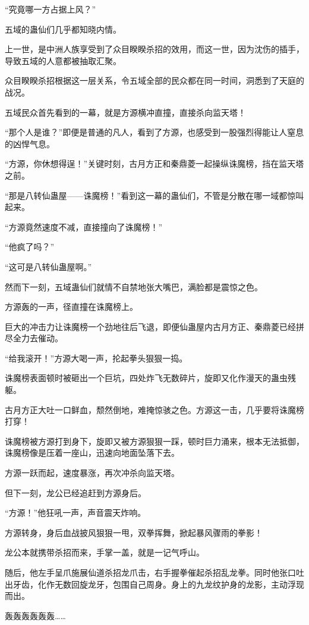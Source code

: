 \begin{this_body}
“究竟哪一方占据上风？”

五域的蛊仙们几乎都知晓内情。

上一世，是中洲人族享受到了众目睽睽杀招的效用，而这一世，因为沈伤的插手，导致五域的人意都被抽取汇聚。

众目睽睽杀招根据这一层关系，令五域全部的民众都在同一时间，洞悉到了天庭的战况。

五域民众首先看到的一幕，就是方源横冲直撞，直接杀向监天塔！

“那个人是谁？”即便是普通的凡人，看到了方源，也感受到一股强烈得能让人窒息的凶悍气息。

“方源，你休想得逞！”关键时刻，古月方正和秦鼎菱一起操纵诛魔榜，挡在监天塔之前。

“那是八转仙蛊屋——诛魔榜！”看到这一幕的蛊仙们，不管是分散在哪一域都惊叫起来。

“方源竟然速度不减，直接撞向了诛魔榜！”

“他疯了吗？”

“这可是八转仙蛊屋啊。”

然而下一刻，五域蛊仙们就情不自禁地张大嘴巴，满脸都是震惊之色。

方源轰的一声，径直撞在诛魔榜上。

巨大的冲击力让诛魔榜一个劲地往后飞退，即便仙蛊屋内古月方正、秦鼎菱已经拼尽全力去催动。

“给我滚开！”方源大喝一声，抡起拳头狠狠一捣。

诛魔榜表面顿时被砸出一个巨坑，四处炸飞无数碎片，旋即又化作漫天的蛊虫残躯。

古月方正大吐一口鲜血，颓然倒地，难掩惊骇之色。方源这一击，几乎要将诛魔榜打穿！

诛魔榜被方源打到身下，旋即又被方源狠狠一踩，顿时巨力涌来，根本无法抵御，诛魔榜像是压着一座山，迅速向地面坠落下去。

方源一跃而起，速度暴涨，再次冲杀向监天塔。

但下一刻，龙公已经追赶到方源身后。

“方源！”他狂吼一声，声音震天炸响。

方源转身，身后血战披风狠狠一甩，双拳挥舞，掀起暴风骤雨的拳影！

龙公本就携带杀招而来，手掌一盖，就是一记气呼山。

随后，他左手呈爪施展仙道杀招龙爪击，右手握拳催起杀招乱龙拳。同时他张口吐出牙齿，化作无数回旋龙牙，包围自己周身。身上的九龙纹护身的龙影，主动浮现而出。

轰轰轰轰轰轰……


\end{this_body}

